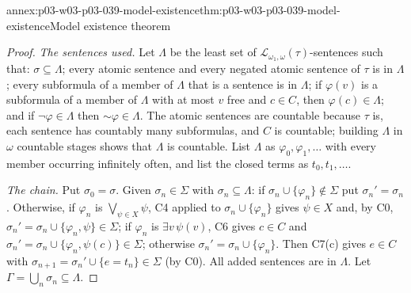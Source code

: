 \begin{annexitem}{annex:p03-w03-p03-039-model-existence}{thm:p03-w03-p03-039-model-existence}{Model existence theorem}
\begin{proof}
\emph{The sentences used.} Let \(\Lambda\) be the least set of
\(\mathcal L_{\omega_1,\omega}(\tau)\)-sentences such that: \(\sigma\subseteq\Lambda\);
every atomic sentence and every negated atomic sentence of \(\tau\) is in
\(\Lambda\); every subformula of a member of \(\Lambda\) that is a sentence is
in \(\Lambda\); if \(\varphi(v)\) is a subformula of a member of \(\Lambda\)
with at most \(v\) free and \(c\in C\), then \(\varphi(c)\in\Lambda\); and if
\(\neg\varphi\in\Lambda\) then \({\sim}\varphi\in\Lambda\). The atomic sentences
are countable because \(\tau\) is, each sentence has countably many
subformulas, and \(C\) is countable; building \(\Lambda\) in \(\omega\)
countable stages shows that \(\Lambda\) is countable. List \(\Lambda\) as
\(\varphi_0,\varphi_1,\ldots\) with every member occurring infinitely often,
and list the closed terms as \(t_0,t_1,\ldots\).

\emph{The chain.} Put \(\sigma_0=\sigma\). Given \(\sigma_n\in\Sigma\) with
\(\sigma_n\subseteq\Lambda\): if \(\sigma_n\cup\{\varphi_n\}\notin\Sigma\)
put \(\sigma_n'=\sigma_n\). Otherwise, if \(\varphi_n\) is
\(\bigvee_{\psi\in X}\psi\), C4 applied to \(\sigma_n\cup\{\varphi_n\}\)
gives \(\psi\in X\) and, by C0, \(\sigma_n'=\sigma_n\cup\{\varphi_n,\psi\}\in\Sigma\);
if \(\varphi_n\) is \(\exists v\,\psi(v)\), C6 gives \(c\in C\) and
\(\sigma_n'=\sigma_n\cup\{\varphi_n,\psi(c)\}\in\Sigma\); otherwise
\(\sigma_n'=\sigma_n\cup\{\varphi_n\}\). Then C7(c) gives \(e\in C\) with
\(\sigma_{n+1}=\sigma_n'\cup\{e=t_n\}\in\Sigma\) (by C0). All added sentences
are in \(\Lambda\). Let \(\Gamma=\bigcup_n\sigma_n\subseteq\Lambda\).


\end{proof}
\end{annexitem}
